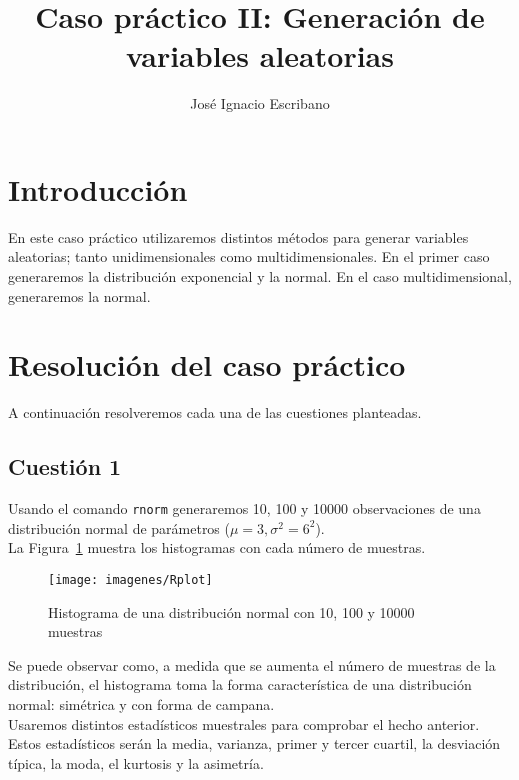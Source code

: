 \documentclass[12pt,a4paper,twoside,openright,titlepage,final]{article}
\author{José Ignacio Escribano}
\title{Caso práctico II: Generación de variables aleatorias}
\begin{document}
\setcounter{page}{1}


\listoftables
\thispagestyle{empty}
\newpage

\tableofcontents
\thispagestyle{empty}
\newpage


\setcounter{page}{1}

\section{Introducción}

En este caso práctico utilizaremos distintos métodos para generar variables aleatorias; tanto unidimensionales como multidimensionales. En el primer caso generaremos la distribución exponencial y la normal. En el caso multidimensional, generaremos la normal.

\section{Resolución del caso práctico}

A continuación resolveremos cada una de las cuestiones planteadas.

\subsection{Cuestión 1}

Usando el comando \texttt{rnorm} generaremos 10, 100 y 10000 observaciones de una distribución normal de parámetros ($\mu = 3, \sigma^2 = 6^2$).\\

La Figura~\ref{fig:Rplot} muestra los histogramas con cada número de muestras.\\

\begin{figure}[htbp!]
\centering
\texttt{[image: imagenes/Rplot]}
\caption{Histograma de una distribución normal con 10, 100 y 10000 muestras}
\label{fig:Rplot}
\end{figure}

Se puede observar como, a medida que se aumenta el número de muestras de la distribución, el histograma toma la forma característica de una distribución normal: simétrica y con forma de campana.\\

Usaremos distintos estadísticos muestrales para comprobar el hecho anterior. Estos estadísticos serán la media, varianza, primer y tercer cuartil, la desviación típica, la moda, el kurtosis y la asimetría. \\
\end{document}
